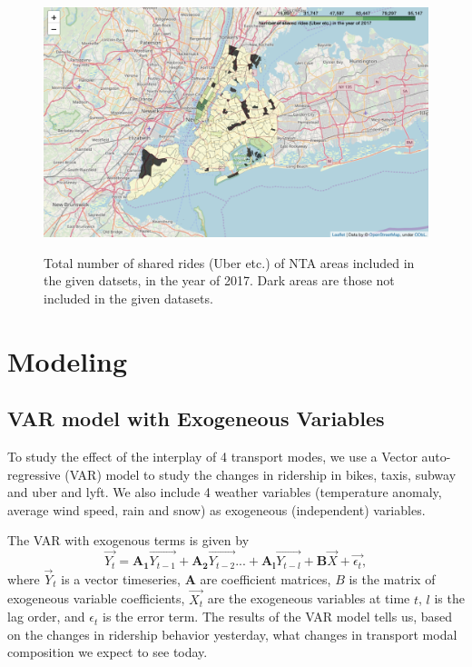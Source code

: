 \documentclass[12pt]{article}
\begin{document}
\begin{figure}[htbp]
    \includegraphics[scale=0.3]{Number_Uber_rides_2017.png} \label{fig:uber}
    \caption{Total number of shared rides (Uber etc.) of NTA areas included in the given datsets, in the year of 2017. Dark areas are those not included in the given datasets.}
\end{figure}



\newpage 
\section*{{\bf Modeling}}



\subsection*{VAR model with Exogeneous Variables}
To study the effect of the interplay of 4 transport modes, we use a Vector auto-regressive (VAR) model to study the changes in ridership in bikes, taxis, subway and uber and lyft. We also include 4 weather variables (temperature anomaly, average wind speed, rain and snow) as exogeneous (independent) variables.

The VAR with exogenous terms is given by
\begin{equation}
    \vec{Y_t} = \mathbf{A_1} \vec{Y_{t-1}} + \mathbf{A_2} \vec{Y_{t-2}} ... + \mathbf{A_l} \vec{Y_{t-l}} + \mathbf{B}\vec{X} + \vec{\epsilon_t},
\end{equation}
where $\vec{Y}_t$ is a vector timeseries, $\mathbf{A}$ are coefficient matrices, $B$ is the matrix of exogeneous variable coefficients, $\vec{X_t}$ are the exogeneous variables at time $t$, $l$ is the lag order, and $\epsilon_t$ is the error term. The results of the VAR model tells us, based on the changes in ridership behavior yesterday, what changes in transport modal composition we expect to see today.
\end{document}
